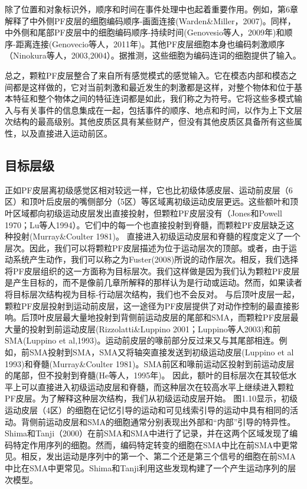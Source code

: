 除了位置和对象标识外，顺序和时间在事件处理中也起着重要作用。例如，第6章解释了中外侧PF皮层的细胞编码顺序-画面连接(Warden\&Miller，2007)。同样，中外侧和尾部PF皮层中的细胞编码顺序-持续时间(Genovesio等人，2009年)和顺序-距离连接(Genovecio等人，2011年)。其他PF皮层细胞本身也编码刺激顺序（Ninokura等人，2003,2004）。据推测，这些细胞为编码连词的细胞提供了输入。
\par
总之，颗粒PF皮层整合了来自所有感觉模式的感觉输入。它在模态内部和模态之间都是这样做的，它对当前刺激和最近发生的刺激都是这样，对整个物体和位于基本特征和整个物体之间的特征连词都是如此，我们称之为符号。它将这些多模式输入与有关事件的信息集成在一起，包括事件的顺序、地点和时间，以作为上下文层次结构的最高级别。其他皮质区具有某些财产，但没有其他皮质区具备所有这些属性，以及直接进入运动前区。

\subsection{目标层级}
\par
正如PF皮层离初级感觉区相对较远一样，它也比初级体感皮层、运动前皮层（6区）和顶叶后皮层的嘴侧部分（5区）等区域离初级运动皮层更远。这些额叶和顶叶区域都向初级运动皮层发出直接投射，但颗粒PF皮层没有（Jones和Powell 1970；Lu等人1994）。它们中的每一个也直接投射到脊髓，而颗粒PF皮层缺乏这种投射(Murray\&Coulter 1981)。
直接进入初级运动皮层和脊髓的程度定义了一个层次。因此，我们可以将颗粒PF皮层描述为位于运动层次的顶部。或者，由于运动系统产生动作，我们可以称之为Fuster(2008)所说的动作层次。相反，我们选择将PF皮层组织的这一方面称为目标层次。我们这样做是因为我们认为颗粒PF皮层是产生目标的，而不是像前几章所解释的那样认为是行动或运动。然而，如果读者将目标层次结构视为目标-行动层次结构，我们也不会反对。
与后顶叶皮层一起，颗粒PF皮层投射到运动前皮层，这一途径为PF皮层提供了对动作控制的最直接影响。后顶叶皮层最大量地投射到背侧前运动皮层的尾部和SMA，而颗粒PF皮层最大量的投射到前运动皮层(Rizzolatti\&Luppino 2001；Luppino等人2003)和前SMA(Luppino et al,1993)。运动前皮层的喙前部分反过来又与其尾部相连。例如，前SMA投射到SMA，SMA又将轴突直接发送到初级运动皮层(Luppino et al 1993)和脊髓(Murray\&Coulter 1981)。SMA前区和喙前运动区投射到前运动皮层的尾部，但不投射到脊髓(He等人，1995年)。
因此，额叶的目标层次在其较低水平上可以直接进入初级运动皮层和脊髓，而这种层次在较高水平上继续进入颗粒PF皮层。为了解释这种层次结构，我们从初级运动皮层开始。
图1.10显示，初级运动皮层（4区）的细胞在记忆引导的运动和可见线索引导的运动中具有相同的活动。背侧前运动皮层和SMA的细胞通常分别表现出外部和“内部”引导的特异性。
Shima和Tanji（2000）在前SMA和SMA中进行了记录，并在这两个区域发现了编码特定作用序列的细胞。然而，编码特定转变的细胞在SMA中比在前SMA中更常见。相反，发出运动是序列中的第一个、第二个还是第三个信号的细胞在前SMA中比在SMA中更常见。Shima和Tanji利用这些发现构建了一个产生运动序列的层次模型。
